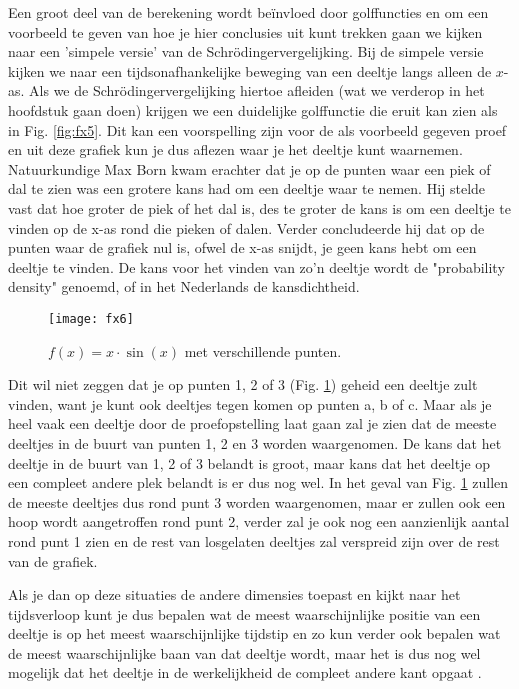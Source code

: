 \documentclass[11pt,fleqn]{book} %
\begin{document}
Een groot deel van de berekening wordt beïnvloed door golffuncties en om een voorbeeld te geven van hoe je hier conclusies uit kunt trekken gaan we kijken naar een 'simpele versie' van de Schrödingervergelijking. Bij de simpele versie kijken we naar een tijdsonafhankelijke beweging van een deeltje langs alleen de $x$-as. Als we de Schrödingervergelijking hiertoe afleiden (wat we verderop in het hoofdstuk gaan doen) krijgen we een duidelijke golffunctie die eruit kan zien als in Fig. \ref{fig:fx5}. Dit kan een voorspelling zijn voor de als voorbeeld gegeven proef en uit deze grafiek kun je dus aflezen waar je het deeltje kunt waarnemen.
Natuurkundige Max Born kwam erachter dat je op de punten waar een piek of dal te zien was een grotere kans had om een deeltje waar te nemen. Hij stelde vast dat hoe groter de piek of het dal is, des te groter de kans is om een deeltje te vinden op de x-as rond die pieken of dalen. Verder concludeerde hij dat op de punten waar de grafiek nul is, ofwel de x-as snijdt, je geen kans hebt om een deeltje te vinden. De kans voor het vinden van zo’n deeltje wordt de "probability density" genoemd, of in het Nederlands de kansdichtheid. 
\begin{figure}[h]
	\centering\texttt{[image: fx6]}
	\caption{$f(x)=x\cdot\sin{(x)}$ met verschillende punten.}
	\label{fig:fx6}
\end{figure}
Dit wil niet zeggen dat je op punten 1, 2 of 3 (Fig. \ref{fig:fx6}) geheid een deeltje zult vinden, want je kunt ook deeltjes tegen komen op punten a, b of c. Maar als je heel vaak een deeltje door de proefopstelling laat gaan zal je zien dat de meeste deeltjes in de buurt van punten 1, 2 en 3 worden waargenomen. De kans dat het deeltje in de buurt van 1, 2 of 3 belandt is groot, maar kans dat het deeltje op een compleet andere plek belandt is er dus nog wel. In het geval van Fig. \ref{fig:fx6} zullen de meeste deeltjes dus rond punt 3 worden waargenomen, maar er zullen ook een hoop wordt aangetroffen rond punt 2, verder zal je ook nog een aanzienlijk aantal rond punt 1 zien en de rest van losgelaten deeltjes zal verspreid zijn over de rest van de grafiek.

Als je dan op deze situaties de andere dimensies toepast en kijkt naar het tijdsverloop kunt je dus bepalen wat de meest waarschijnlijke positie van een deeltje is op het meest waarschijnlijke tijdstip en zo kun verder ook bepalen wat de meest waarschijnlijke baan van dat deeltje wordt, maar het is dus nog wel mogelijk dat het deeltje in de werkelijkheid de compleet andere kant opgaat \cite{wavefunction}\cite{whatsitmean}\cite{whatsit}.
\end{document}
